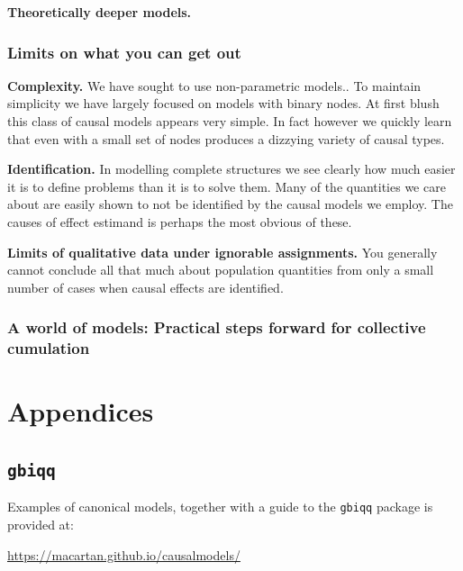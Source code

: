 \documentclass[12pt,]{book}
\begin{document}
\textbf{Theoretically deeper models.}

\hypertarget{limits-on-what-you-can-get-out}{%
\section{Limits on what you can get out}\label{limits-on-what-you-can-get-out}}

\textbf{Complexity.} We have sought to use non-parametric models.. To maintain simplicity we have largely focused on models with binary nodes. At first blush this class of causal models appears very simple. In fact however we quickly learn that even with a small set of nodes produces a dizzying variety of causal types.

\textbf{Identification.} In modelling complete structures we see clearly how much easier it is to define problems than it is to solve them. Many of the quantities we care about are easily shown to not be identified by the causal models we employ. The causes of effect estimand is perhaps the most obvious of these.

\textbf{Limits of qualitative data under ignorable assignments.} You generally cannot conclude all that much about population quantities from only a small number of cases when causal effects are identified.

\hypertarget{a-world-of-models-practical-steps-forward-for-collective-cumulation}{%
\section{A world of models: Practical steps forward for collective cumulation}\label{a-world-of-models-practical-steps-forward-for-collective-cumulation}}

\hypertarget{part-appendices}{%
\part{Appendices}\label{part-appendices}}

\hypertarget{examplesappendix}{%
\chapter{\texorpdfstring{\texttt{gbiqq}}{gbiqq}}\label{examplesappendix}}

Examples of canonical models, together with a guide to the \texttt{gbiqq} package is provided at:

\url{https://macartan.github.io/causalmodels/}


\end{document}
